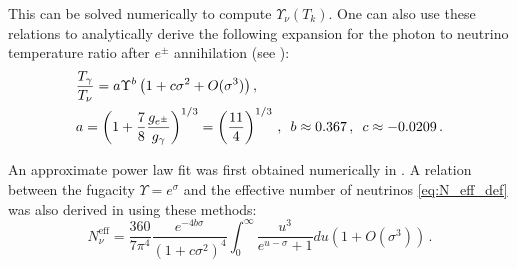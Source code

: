 This can be solved numerically to compute $\Upsilon_\nu(T_k)$. One can also use these relations to analytically derive the following expansion for the photon to neutrino temperature ratio after $e^\pm$ annihilation (see \cite{Birrell:2012gg}):
\begin{align}\label{Upsilon_ratio}
&\frac{T_\gamma}{T_\nu}=a\Upsilon^{b}\left(1+c\sigma^2+O(\sigma^3)\right),\\
\label{value_a}
&a=\left(1+\frac{7}{8}\frac{g_{e^\pm}}{g_\gamma}\right)^{1/3}=\left(\frac{11}{4}\right)^{1/3}\,,\,\,\,b\approx 0.367\,, \,\,\,c\approx -0.0209\,.\notag
\end{align}

An approximate power law fit was first obtained numerically in \cite{Birrell:2013gpa}. A relation between the fugacity $\Upsilon=e^\sigma$ and the effective number of neutrinos \eqref{eq:N_eff_def} was also derived in \cite{Birrell:2012gg} using these methods:
\begin{equation}\label{N_nu_approx}
N^{\mathrm{eff}}_\nu=\frac{360}{7\pi^4}\frac{e^{-4b\sigma}}{(1+c\sigma^2)^4}\int_0^\infty \frac{u^3}{e^{u-\sigma}+1}du\left(1+O(\sigma^3)\right)\,.
\end{equation}


